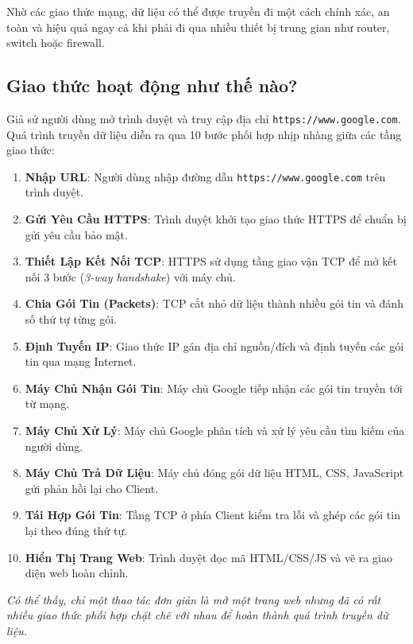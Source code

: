 \documentclass[11pt,oneside]{book}
\newcommand{\codeinline}[1]{\textcolor{accentOrange}{\texttt{#1}}}
\begin{document}
Nhờ các giao thức mạng, dữ liệu có thể được truyền đi một cách chính xác, an toàn và hiệu quả ngay cả khi phải đi qua nhiều thiết bị trung gian như router, switch hoặc firewall.

\subsection{Giao thức hoạt động như thế nào?}

Giả sử người dùng mở trình duyệt và truy cập địa chỉ \codeinline{https://www.google.com}. Quá trình truyền dữ liệu diễn ra qua 10 bước phối hợp nhịp nhàng giữa các tầng giao thức:

\begin{conceptBox}
\begin{enumerate}[label=\textbf{\color{conceptBorder}Bước \arabic*:}, leftmargin=4.8em, itemsep=3pt, parsep=0pt, topsep=4pt]
    \item \textbf{Nhập URL}: Người dùng nhập đường dẫn \codeinline{https://www.google.com} trên trình duyệt.
    \item \textbf{Gửi Yêu Cầu HTTPS}: Trình duyệt khởi tạo giao thức HTTPS để chuẩn bị gửi yêu cầu bảo mật.
    \item \textbf{Thiết Lập Kết Nối TCP}: HTTPS sử dụng tầng giao vận TCP để mở kết nối 3 bước (\textit{3-way handshake}) với máy chủ.
    \item \textbf{Chia Gói Tin (Packets)}: TCP cắt nhỏ dữ liệu thành nhiều gói tin và đánh số thứ tự từng gói.
    \item \textbf{Định Tuyến IP}: Giao thức IP gán địa chỉ nguồn/đích và định tuyến các gói tin qua mạng Internet.
    \item \textbf{Máy Chủ Nhận Gói Tin}: Máy chủ Google tiếp nhận các gói tin truyền tới từ mạng.
    \item \textbf{Máy Chủ Xử Lý}: Máy chủ Google phân tích và xử lý yêu cầu tìm kiếm của người dùng.
    \item \textbf{Máy Chủ Trả Dữ Liệu}: Máy chủ đóng gói dữ liệu HTML, CSS, JavaScript gửi phản hồi lại cho Client.
    \item \textbf{Tái Hợp Gói Tin}: Tầng TCP ở phía Client kiểm tra lỗi và ghép các gói tin lại theo đúng thứ tự.
    \item \textbf{Hiển Thị Trang Web}: Trình duyệt đọc mã HTML/CSS/JS và vẽ ra giao diện web hoàn chỉnh.
\end{enumerate}
\end{conceptBox}
\textit{Có thể thấy, chỉ một thao tác đơn giản là mở một trang web nhưng đã có rất nhiều giao thức phối hợp chặt chẽ với nhau để hoàn thành quá trình truyền dữ liệu.}
\end{document}
